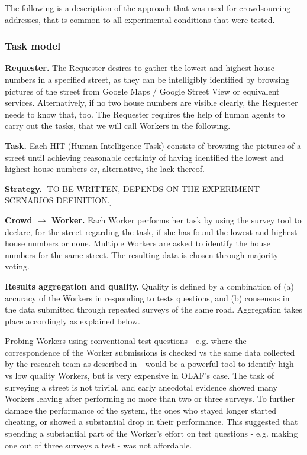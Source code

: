     The following is a description of the approach that was used for crowdsourcing addresses, that is common to all experimental conditions that were tested.

    \subsubsection{Task model}

        \textbf{Requester.} The Requester desires to gather the lowest and highest house numbers in a specified street, as they can be intelligibly identified by browsing pictures of the street from Google Maps / Google Street View or equivalent services. Alternatively, if no two house numbers are visible clearly, the Requester needs to know that, too. The Requester requires the help of human agents to carry out the tasks, that we will call Workers in the following.
        
        \textbf{Task.} Each HIT (Human Intelligence Task) consists of browsing the pictures of a street until achieving reasonable certainty of having identified the lowest and highest house numbers or, alternative, the lack thereof.
        
        \textbf{Strategy.} 
        {[}TO BE WRITTEN, DEPENDS ON THE EXPERIMENT SCENARIOS DEFINITION.{]}
        
        \textbf{Crowd $\rightarrow$ Worker.} Each Worker performs her task by using the survey tool to declare, for the street regarding the task, if she has found the lowest and highest house numbers or none. Multiple Workers are asked to identify the house numbers for the same street. The resulting data is chosen through majority voting.
    
        \textbf{Results aggregation and quality.} Quality is defined by a combination of (a) accuracy of the Workers in responding to tests questions, and (b) consensus in the data submitted through repeated surveys of the same road. Aggregation takes place accordingly as explained below.
        
        Probing Workers using conventional test questions - e.g. where the correspondence of the Worker submissions is checked vs the same data collected by the research team as described in \cite{Kittur:2008gj} - would be a powerful tool to identify high vs low quality Workers, but is very expensive in OLAF's case. The task of surveying a street is not trivial, and early anecdotal evidence showed many Workers leaving after performing no more than two or three surveys. To further damage the performance of the system, the ones who stayed longer started cheating, or showed a substantial drop in their performance. This suggested that spending a substantial part of the Worker's effort on test questions - e.g. making one out of three surveys a test - was not affordable.
        
